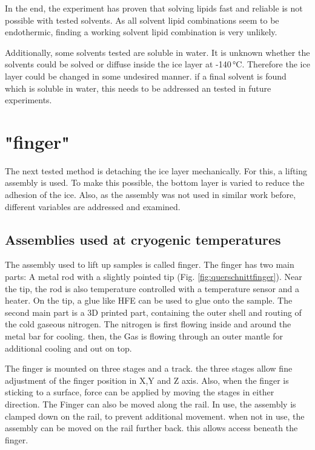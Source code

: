 In the end, the experiment has proven that solving lipids fast and reliable is not possible with tested solvents. As all solvent lipid combinations seem to be endothermic, finding a working solvent lipid combination is very unlikely.

Additionally, some solvents tested are soluble in water. It is unknown whether the solvents could be solved or diffuse inside the ice layer at -140\,°C. Therefore the ice layer could be changed in some undesired manner. if a final solvent is found which is soluble in water, this needs to be addressed an tested in future experiments.

\section{"finger"}

The next tested method is detaching the ice layer mechanically. For this, a lifting assembly is used. To make this possible, the bottom layer is varied to reduce the adhesion of the ice. Also, as the assembly was not used in similar work before, different variables are addressed and examined.  

\subsection{Assemblies used at cryogenic temperatures}

The assembly used to lift up samples is called finger. The finger has two main parts: A metal rod with a slightly pointed tip (Fig. \ref{fig:querschnittfinger}). Near the tip, the rod is also temperature controlled with a temperature sensor and a heater. On the tip, a glue like HFE can be used to glue onto the sample. The second main part is a 3D printed part, containing the outer shell and routing of the cold gaseous nitrogen. The nitrogen is first flowing inside and around the metal bar for cooling. then, the Gas is flowing through an outer mantle for additional cooling and out on top.

The finger is  mounted on three stages and a track. the three stages allow fine adjustment of the finger position in X,Y and Z axis. Also, when the finger is sticking to a surface, force can be applied by moving the stages in either direction. The Finger can also be moved along the rail. In use, the assembly is clamped down on the rail, to prevent additional movement. when not in use, the assembly can be moved on the rail further back. this allows access beneath the finger.

